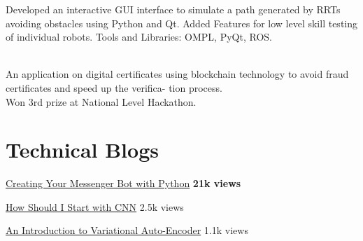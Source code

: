 \documentclass[]{deedy-resume-openfont}
\begin{document}
Developed an interactive GUI interface to simulate a path generated by RRTs avoiding obstacles using Python and Qt.
Added Features for low level skill testing of individual robots.
Tools and Libraries: OMPL, PyQt, ROS.
\sectionsep

\\ An application on digital certificates using blockchain technology to avoid fraud certificates and speed up the verifica-
tion process. \\
Won 3rd prize at National Level Hackathon.
\sectionsep

\section{Technical Blogs}
\descript{\hfill}
\begin{tightemize}
\item \href{https://tutorials.botsfloor.com/creating-your-messenger-bot-4f71af99d26b}{Creating Your Messenger Bot with Python} \hfill \textbf{21k views}
\item \href{https://becominghuman.ai/how-should-i-start-with-cnn-c62a3a89493b}{How Should I Start with CNN} \hfill 2.5k views
\item \href{https://medium.com/@rahulvernwal/an-introduction-to-vae-c347aea57849}{An Introduction to Variational Auto-Encoder} \hfill 1.1k views
\end{tightemize}
\sectionsep
\end{document}
